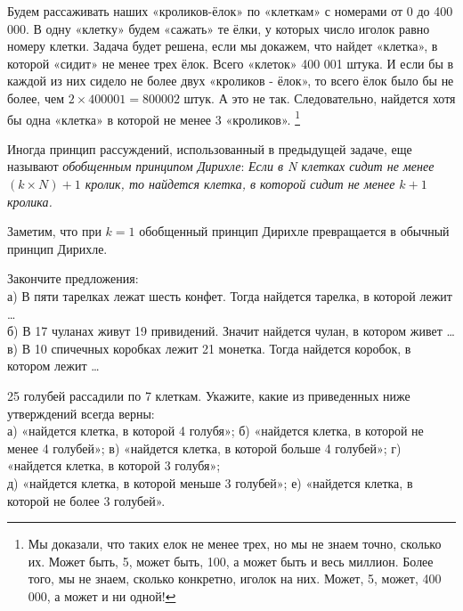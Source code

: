 \begin{prf}
	Будем рассаживать наших «кроликов-ёлок» по «клеткам» с номерами от 0 до 400 000. В одну «клетку» будем «сажать» те ёлки, у которых число иголок равно номеру клетки. Задача будет решена, если мы докажем, что найдет «клетка», в которой «сидит» не менее трех ёлок. Всего «клеток» 400 001 штука. И если бы в каждой из них сидело не более двух «кроликов - ёлок», то всего ёлок было бы не более, чем  $2\times400001=800002$ штук. А это не так. Следовательно, найдется хотя бы одна «клетка» в которой не менее 3 «кроликов». \footnote{Мы доказали, что таких елок не менее трех, но мы не знаем точно, сколько их. Может быть, 5, может быть, 100, а может быть и весь миллион. Более того, мы не знаем, сколько конкретно, иголок на них. Может, 5, может, 400 000, а может и ни одной!}
\end{prf}

Иногда принцип рассуждений, использованный в предыдущей задаче, еще называют \textit{обобщенным принципом Дирихле}: \textit{Если в N клетках сидит не менее $(k\times N)+1$ кролик, то найдется клетка, в которой сидит не менее $k+1$ кролика.}

Заметим, что при $k =1$ обобщенный принцип Дирихле превращается в обычный принцип Дирихле.

\begin{ex}\label{u12}
	Закончите предложения:\\
	а) В пяти тарелках лежат шесть конфет. Тогда найдется тарелка, в которой лежит \dots\\
	б) В 17 чуланах живут 19 привидений. Значит найдется чулан, в котором живет \dots\\
	в) В 10 спичечных коробках лежит 21 монетка. Тогда найдется коробок, в котором лежит \dots	
\end{ex}

\begin{ex}\label{u13}	25 голубей рассадили по 7 клеткам. Укажите, какие из приведенных ниже утверждений всегда верны: \\
	а) «найдется клетка, в которой 4 голубя»;     б) «найдется клетка, в которой не менее 4 голубей»;
	в) «найдется клетка, в которой больше 4 голубей»; г) «найдется клетка, в которой 3 голубя»;\\
	д) «найдется клетка, в которой меньше 3 голубей»; е) «найдется клетка, в которой не более 3 голубей».
\end{ex}